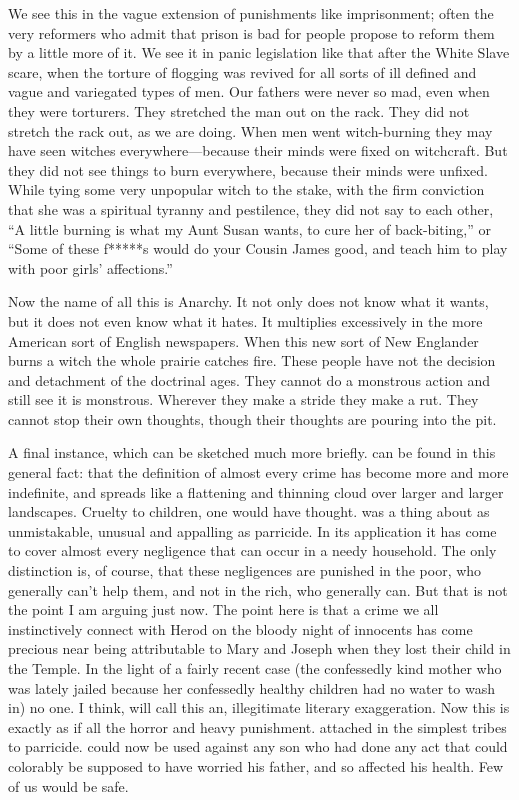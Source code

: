 \documentclass{book}
\begin{document}
We see this in the vague extension of punishments like imprisonment; often the very reformers who admit that prison is bad for people propose to reform them by a little more of it. We see it in panic legislation like that after the White Slave scare, when the torture of flogging was revived for all sorts of ill defined and vague and variegated types of men. Our fathers were never so mad, even when they were torturers. They stretched the man out on the rack. They did not stretch the rack out, as we are doing. When men went witch-burning they may have seen witches everywhere—because their minds were fixed on witchcraft. But they did not see things to burn everywhere, because their minds were unfixed. While tying some very unpopular witch to the stake, with the firm conviction that she was a spiritual tyranny and pestilence, they did not say to each other, “A little burning is what my Aunt Susan wants, to cure her of back-biting,” or “Some of these f*****s would do your Cousin James good, and teach him to play with poor girls’ affections.”

Now the name of all this is Anarchy. It not only does not know what it wants, but it does not even know what it hates. It multiplies excessively in the more American sort of English newspapers. When this new sort of New Englander burns a witch the whole prairie catches fire. These people have not the decision and detachment of the doctrinal ages. They cannot do a monstrous action and still see it is monstrous. Wherever they make a stride they make a rut. They cannot stop their own thoughts, though their thoughts are pouring into the pit.

A final instance, which can be sketched much more briefly. can be found in this general fact: that the definition of almost every crime has become more and more indefinite, and spreads like a flattening and thinning cloud over larger and larger landscapes. Cruelty to children, one would have thought. was a thing about as unmistakable, unusual and appalling as parricide. In its application it has come to cover almost every negligence that can occur in a needy household. The only distinction is, of course, that these negligences are punished in the poor, who generally can’t help them, and not in the rich, who generally can. But that is not the point I am arguing just now. The point here is that a crime we all instinctively connect with Herod on the bloody night of innocents has come precious near being attributable to Mary and Joseph when they lost their child in the Temple. In the light of a fairly recent case (the confessedly kind mother who was lately jailed because her confessedly healthy children had no water to wash in) no one. I think, will call this an, illegitimate literary exaggeration. Now this is exactly as if all the horror and heavy punishment. attached in the simplest tribes to parricide. could now be used against any son who had done any act that could colorably be supposed to have worried his father, and so affected his health. Few of us would be safe.
\end{document}
